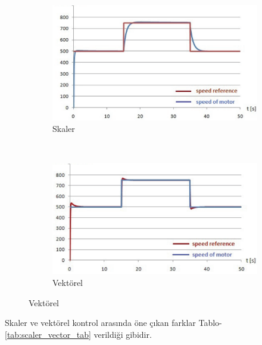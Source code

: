 \documentclass[10pt,a4paper]{article}
\begin{document}
	\begin{figure}[hp]
		\centering
		\begin{subfigure}[b]{0.4\textwidth}
			\shorthandoff{=}
			\includegraphics[width=\textwidth]{speed_scaler.png}
			\caption{Skaler}
			\label{subfig:speed_scaler}
			\shorthandon{=}
		\end{subfigure}
		~
		\begin{subfigure}[b]{0.4\textwidth}
			\shorthandoff{=}
			\includegraphics[width=\textwidth]{speed_vector.png}
			\caption{Vektörel}
			\label{subfig:speed_vector}
			\shorthandon{=}
		\end{subfigure}
	\end{figure}
	
	Skaler ve vektörel kontrol arasında öne çıkan farklar Tablo-\ref{tab:scaler_vector_tab} verildiği gibidir.
	
\end{document}
